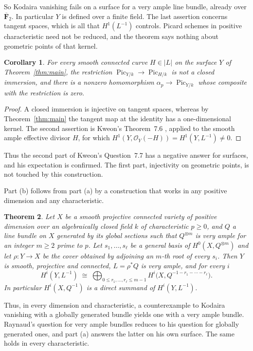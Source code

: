 \documentclass[11pt,a4paper]{article}
\theoremstyle{plain}
\newtheorem{theorem}{Theorem}
\newtheorem{corollary}[theorem]{Corollary}
\theoremstyle{remark}
\newcommand{\OO}{\mathcal O}
\newcommand{\F}{\mathbf F}
\newcommand{\Pic}{\operatorname{Pic}}
\begin{document}
So Kodaira vanishing fails on a surface for a very ample line bundle, already over $\overline{\F}_2$. In particular
$Y$ is defined over a finite field. The last assertion concerns tangent spaces, which is all that $H^1(L^{-1})$
controls. Picard schemes in positive characteristic need not be reduced, and the theorem says nothing about geometric
points of that kernel.

\begin{corollary}\label{cor:kweon}
For every smooth connected curve $H\in|L|$ on the surface $Y$ of Theorem~\ref{thm:main}, the restriction
$\Pic_{Y/k}\to\Pic_{H/k}$ is not a closed immersion, and there is a nonzero homomorphism $\alpha_p\to\Pic_{Y/k}$
whose composite with the restriction is zero.
\end{corollary}

\begin{proof}
A closed immersion is injective on tangent spaces, whereas by Theorem~\ref{thm:main} the tangent map at the identity
has a one-dimensional kernel. The second assertion is Kweon's Theorem~7.6 \cite[p.~18]{Kweon}, applied to the smooth
ample effective divisor $H$, for which $H^1(Y,\OO_Y(-H))=H^1(Y,L^{-1})\ne0$.
\end{proof}

Thus the second part of Kweon's Question~7.7 has a negative answer for surfaces, and his expectation is confirmed. The
first part, injectivity on geometric points, is not touched by this construction.

Part (b) follows from part (a) by a construction that works in any positive dimension and any characteristic.

\begin{theorem}\label{thm:roots}
Let $X$ be a smooth projective connected variety of positive dimension over an algebraically closed field $k$ of
characteristic $p\ge0$, and
$Q$ a line bundle on $X$ generated by its global sections such that $Q^{\otimes m}$ is very ample for an integer $m\ge2$
prime to $p$. Let $s_1,\dots,s_\ell$ be a general basis of $H^0(X,Q^{\otimes m})$ and let $\rho:Y\to X$ be the cover
obtained by adjoining an $m$-th root of every $s_i$. Then $Y$ is smooth, projective and connected, $L=\rho^*Q$ is very
ample, and for every $i$
\[
 H^i(Y,L^{-1})\;\cong\;\bigoplus_{0\le r_1,\dots,r_\ell\le m-1} H^i\bigl(X,Q^{-1-r_1-\cdots-r_\ell}\bigr).
\]
In particular $H^i(X,Q^{-1})$ is a direct summand of $H^i(Y,L^{-1})$.
\end{theorem}

Thus, in every dimension and characteristic, a counterexample to Kodaira vanishing with a globally generated bundle
yields one with a very ample bundle. Raynaud's question for very ample bundles reduces to his question for globally
generated ones, and part (a) answers the latter on his own surface. The same holds in every characteristic.
\end{document}
